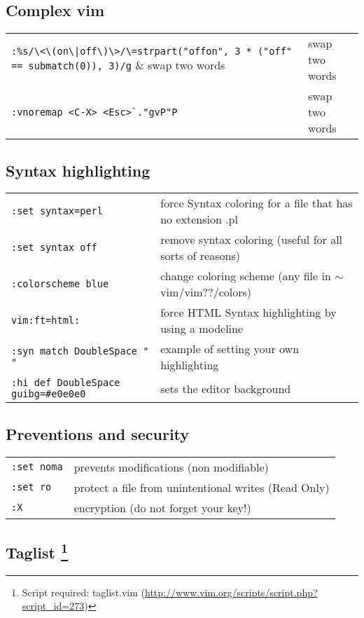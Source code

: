 \subsection{Complex vim}
\begin{center}
\begin{longtable}{l|l}
\verb!:%s/\<\(on\|off\)\>/\=strpart("offon", 3 * ("off" == submatch(0)), 3)/g! & swap two words\\
\verb!:vnoremap <C-X> <Esc>`."gvP"P! & swap two words
\end{longtable}
\end{center}

\subsection{Syntax highlighting}
\begin{center}
\begin{longtable}{l|l}
 \verb!:set syntax=perl! & force Syntax coloring for a file that has no extension .pl\\
 \verb!:set syntax off! & remove syntax coloring (useful for all sorts of reasons)\\
 \verb!:colorscheme blue! & change coloring scheme (any file in $\sim$vim/vim??/colors)\\
 \verb!vim:ft=html:! & force HTML Syntax highlighting by using a modeline\\
 \verb!:syn match DoubleSpace " "! & example of setting your own highlighting\\
 \verb!:hi def DoubleSpace guibg=#e0e0e0! & sets the editor background
\end{longtable}
\end{center}

\subsection{Preventions and security}
\begin{center}
\begin{longtable}{l|l}
 \verb!:set noma! & prevents modifications (non modifiable)\\
 \verb!:set ro! & protect a file from unintentional writes (Read Only)\\
 \verb!:X! & encryption (do not forget your key!)
\end{longtable}
\end{center}

\subsection[Taglist]
{Taglist \footnote{Script required: taglist.vim (\href{http://www.vim.org/scripts/script.php?script\_id=273}{http://www.vim.org/scripts/script.php?script\_id=273})}}

